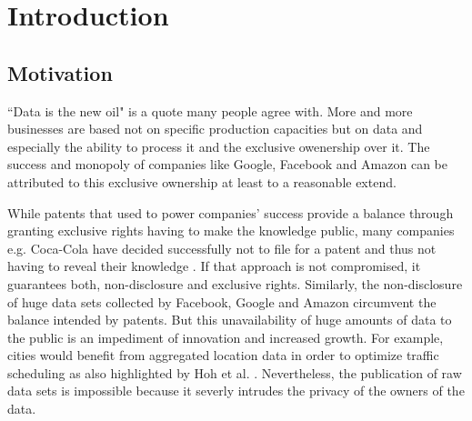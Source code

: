 
\chapter{Introduction}\label{chapter:introduction}
\section{Motivation}

“Data is the new oil" \parencite{data-is-the-new-oil, data-is-the-new-oil2} is a quote many people agree with. More and more businesses are based not on specific production capacities but on data and especially the ability to process it and the exclusive owenership over it. The success and monopoly of companies like Google, Facebook and Amazon can be attributed to this exclusive ownership at least to a reasonable extend.

While patents that used to power companies' success provide a balance through granting exclusive rights having to make the knowledge public, many companies e.g. Coca-Cola have decided successfully not to file for a patent and thus not having to reveal their knowledge \parencite{coca-cola}. If that approach is not compromised, it guarantees both, non-disclosure and  exclusive rights. Similarly, the non-disclosure of huge data sets collected by Facebook, Google and Amazon circumvent the balance intended by patents. But this unavailability of huge amounts of data to the public is an impediment of innovation and increased growth. For example, cities would benefit from aggregated location data in order to optimize traffic scheduling as also highlighted by Hoh et al. \parencite{hoh2005protecting}.
Nevertheless, the publication of raw data sets is impossible because it severly intrudes the privacy of the owners of the data.

